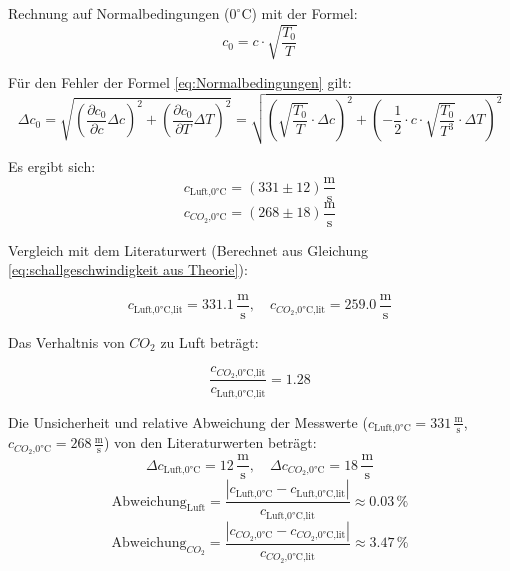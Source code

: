 \documentclass[12pt,a4paper,titlepage]{scrartcl}
\numberwithin{equation}{section}
\numberwithin{table}{section}
\numberwithin{figure}{section}
\begin{document}
Rechnung auf Normalbedingungen ($0^{\circ}\text{C}$) mit der Formel:
\begin{equation}
    c_0 = c \cdot \sqrt{\frac{T_0}{T}}\label{eq:Normalbedingungen}
\end{equation}

Für den Fehler der Formel \ref{eq:Normalbedingungen} gilt:
\begin{equation}
    \Delta c_0 = \sqrt{\left(\frac{\partial c_0}{\partial c} \Delta c\right)^2 + \left(\frac{\partial c_0}{\partial T} \Delta T\right)^2} = \sqrt{\left(\sqrt{\frac{T_0}{T}} \cdot \Delta c\right)^2 + \left(-\frac{1}{2} \cdot c \cdot \sqrt{\frac{T_0}{T^3}} \cdot \Delta T\right)^2}\label{eq:Normalbedingungen_fehler}
\end{equation}

Es ergibt sich:
\begin{equation}
    c_\text{Luft,0°C} = \left(331\pm 12\right) \frac{\text{m}}{\text{s}}
\end{equation}
\begin{equation}
    c_\text{$CO_2$,0°C} = \left(268\pm 18\right) \frac{\text{m}}{\text{s}}
\end{equation}


Vergleich mit dem Literaturwert (Berechnet aus Gleichung \ref{eq:schallgeschwindigkeit aus Theorie}):

\begin{equation}
    c_\text{Luft,0°C,lit} = 331.1\,\frac{\text{m}}{\text{s}}, \quad c_\text{$CO_2$,0°C,lit} = 259.0\,\frac{\text{m}}{\text{s}}
\end{equation}

Das Verhaltnis von $CO_2$ zu Luft beträgt:

\begin{equation}
    \frac{c_\text{$CO_2$,0°C,lit}}{c_\text{Luft,0°C,lit}} = 1.28
\end{equation}

Die Unsicherheit und relative Abweichung der Messwerte ($c_\text{Luft,0°C} = 331\,\frac{\text{m}}{\text{s}}$, $c_\text{$CO_2$,0°C} = 268\,\frac{\text{m}}{\text{s}}$) von den Literaturwerten beträgt:
\begin{equation}
    \Delta c_\text{Luft,0°C} = 12\,\frac{\text{m}}{\text{s}}, \quad \Delta c_\text{$CO_2$,0°C} = 18\,\frac{\text{m}}{\text{s}}
\end{equation}
\begin{equation}
    \text{Abweichung}_\text{Luft} = \frac{|c_\text{Luft,0°C} - c_\text{Luft,0°C,lit}|}{c_\text{Luft,0°C,lit}} \approx 0.03\,\%
\end{equation}
\begin{equation}
    \text{Abweichung}_\text{$CO_2$} = \frac{|c_\text{$CO_2$,0°C} - c_\text{$CO_2$,0°C,lit}|}{c_\text{$CO_2$,0°C,lit}} \approx 3.47\,\%
\end{equation}
\end{document}
